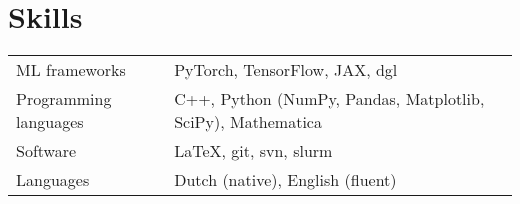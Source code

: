 \documentclass[a4paper,12pt]{article}
\begin{document}
\section{Skills}
\begin{tabularx}{\linewidth}{@{}l X@{}}
ML frameworks & \normalsize{PyTorch, TensorFlow, JAX, dgl} \\
Programming languages & \normalsize{C++, Python (NumPy, Pandas, Matplotlib, SciPy), Mathematica} \\
Software & \normalsize{LaTeX, git, svn, slurm}  \\
Languages & \normalsize{Dutch (native), English (fluent)}
\end{tabularx}

\vfill
{}
\end{document}
